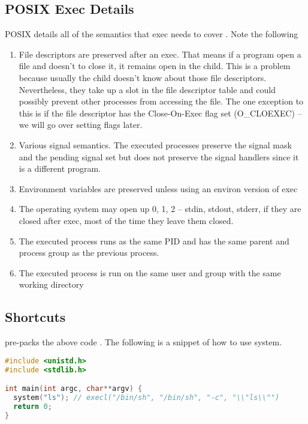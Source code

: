 \subsection{POSIX Exec Details}

POSIX details all of the semantics that exec needs to cover \cite{exec_2018}.
Note the following

\begin{enumerate}
\item File descriptors are preserved after an exec. That means if a program open a file and doesn't to close it, it remains open in the child.
  This is a problem because usually the child doesn't know about those file descriptors. Nevertheless, they take up a slot in the file descriptor table and could possibly prevent other processes from accessing the file.
  The one exception to this is if the file descriptor has the Close-On-Exec flag set (O\_CLOEXEC) -- we will go over setting flags later.
\item Various signal semantics. The executed processes preserve the signal mask and the pending signal set but does not preserve the signal handlers since it is a different program.
\item Environment variables are preserved unless using an environ version of exec
\item The operating system may open up 0, 1, 2 -- stdin, stdout, stderr, if they are closed after exec, most of the time they leave them closed.
\item The executed process runs as the same PID and has the same parent and process group as the previous process.
\item The executed process is run on the same user and group with the same working directory
\end{enumerate}

\subsection{Shortcuts}

 pre-packs the above code \cite[P. 371]{jones2010wg14}.
The following is a snippet of how to use system.

\begin{lstlisting}[language=C]
#include <unistd.h>
#include <stdlib.h>

int main(int argc, char**argv) {
  system("ls"); // execl("/bin/sh", "/bin/sh", "-c", "\\"ls\\"")
  return 0;
}
\end{lstlisting}

